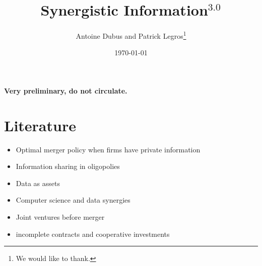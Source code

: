 \documentclass[a4paper]{article}
\begin{document}
\title{Synergistic Information$^{3.0}$}
\author{Antoine Dubus and Patrick Legros\thanks{We would like to thank.}}
\date{\today}


\maketitle

\begin{abstract}

\noindent 

\end{abstract}
 
\textbf{Very preliminary, do not circulate.}

\baselineskip0.7cm

\section{Literature}
\begin{itemize}\setlength\itemsep{-1em}
    \item Optimal merger policy when firms have private information \cite{Besanko1993}
    \item Information sharing in oligopolies
    \item Data as assets
    \item Computer science and data synergies
    \item Joint ventures before merger
    \item incomplete contracts and cooperative investments \citep{Che1999}
\end{itemize}
\end{document}
